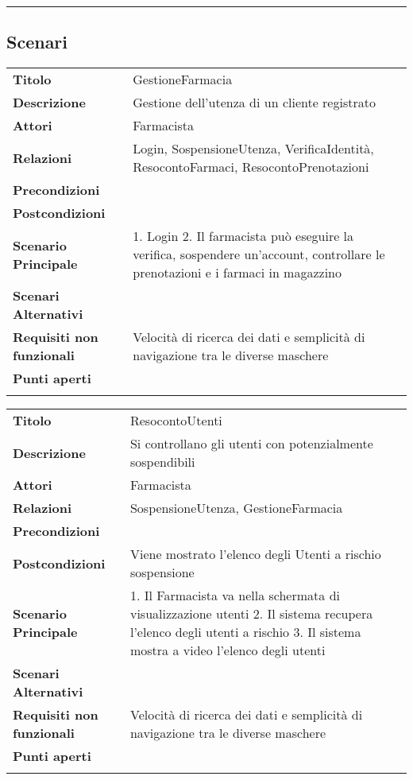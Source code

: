 \begin{center}\rule{3in}{0.4pt}\end{center}

\subsection{Scenari}\label{scenari}

\begin{longtable}[c]{@{}ll@{}}
\toprule\addlinespace
\textbf{Titolo} & GestioneFarmacia
\\\addlinespace
\textbf{Descrizione} & Gestione dell'utenza di un cliente registrato
\\\addlinespace
\textbf{Attori} & Farmacista
\\\addlinespace
\textbf{Relazioni} & Login, SospensioneUtenza, VerificaIdentità,
ResocontoFarmaci, ResocontoPrenotazioni
\\\addlinespace
\textbf{Precondizioni} &
\\\addlinespace
\textbf{Postcondizioni} &
\\\addlinespace
\textbf{Scenario Principale} & 1. Login 2. Il farmacista può eseguire la
verifica, sospendere un'account, controllare le prenotazioni e i farmaci
in magazzino
\\\addlinespace
\textbf{Scenari Alternativi} &
\\\addlinespace
\textbf{Requisiti non funzionali} & Velocità di ricerca dei dati e
semplicità di navigazione tra le diverse maschere
\\\addlinespace
\textbf{Punti aperti} &
\\\addlinespace
\bottomrule
\end{longtable}

\begin{longtable}[c]{@{}ll@{}}
\toprule\addlinespace
\textbf{Titolo} & ResocontoUtenti
\\\addlinespace
\textbf{Descrizione} & Si controllano gli utenti con potenzialmente
sospendibili
\\\addlinespace
\textbf{Attori} & Farmacista
\\\addlinespace
\textbf{Relazioni} & SospensioneUtenza, GestioneFarmacia
\\\addlinespace
\textbf{Precondizioni} &
\\\addlinespace
\textbf{Postcondizioni} & Viene mostrato l'elenco degli Utenti a rischio
sospensione
\\\addlinespace
\textbf{Scenario Principale} & 1. Il Farmacista va nella schermata di
visualizzazione utenti 2. Il sistema recupera l'elenco degli utenti a
rischio 3. Il sistema mostra a video l'elenco degli utenti
\\\addlinespace
\textbf{Scenari Alternativi} &
\\\addlinespace
\textbf{Requisiti non funzionali} & Velocità di ricerca dei dati e
semplicità di navigazione tra le diverse maschere
\\\addlinespace
\textbf{Punti aperti} &
\\\addlinespace
\bottomrule
\end{longtable}

